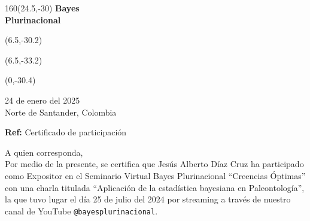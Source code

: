 \documentclass[a4paper,11pt]{letter}
\begin{document}
\begin{letter}

\begin{textblock}{160}(24.5,-30)
\noindent \Huge\textbf{Bayes \\ Plurinacional \\}
\end{textblock}
\begin{textblock}{80}(6.5,-30.2)
\LARGE  {}
\end{textblock}
\begin{textblock}{80}(6.5,-33.2)
\LARGE {}
\end{textblock}
\begin{textblock}{80}(0,-30.4)
\LARGE {\scalebox{2.505}{$($}}
\end{textblock}




\vspace{-1cm}

\begin{flushright}
24 de enero del 2025  \\
Norte de Santander, Colombia \\
\end{flushright}

\vspace{1cm}
\noindent

\textbf{Ref:} Certificado de participación\\

\vspace{1cm}

\noindent A quien corresponda, \\ [0.3cm]

\hspace{1cm} Por medio de la presente, se certifica que Jesús Alberto Díaz Cruz ha participado como Expositor en el Seminario Virtual Bayes Plurinacional ``Creencias Óptimas'' con una charla titulada ``Aplicación de la estadística bayesiana en Paleontología'', la que tuvo lugar el día 25 de julio del 2024 por streaming a través de nuestro canal de YouTube \texttt{@bayesplurinacional}.


\end{letter}
\end{document}
